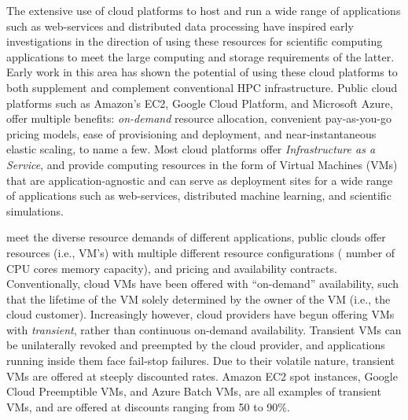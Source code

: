 \vikram
{
The extensive use of cloud platforms to host and run a wide range of applications such as web-services and distributed data processing have inspired early investigations in the direction of using these resources for scientific computing applications to meet the large computing and storage requirements of the latter. Early work in this area has shown the potential of using these cloud platforms to both supplement and complement conventional HPC infrastructure. Public cloud platforms such as Amazon's EC2, Google Cloud Platform, and Microsoft Azure, offer multiple benefits: \emph{on-demand} resource allocation, convenient pay-as-you-go pricing models, ease of provisioning and deployment, and near-instantaneous elastic scaling, to name a few. Most cloud platforms offer \emph{Infrastructure as a Service}, and provide computing resources in the form of Virtual Machines (VMs) that are application-agnostic and can serve as deployment sites for a wide range of applications such as web-services, distributed machine learning, and scientific simulations. 
}


 meet the diverse resource demands of different applications, public clouds offer resources (i.e., VM's) with multiple different resource configurations ( number of CPU cores memory capacity), and pricing and availability contracts. 
Conventionally, cloud VMs have been offered with ``on-demand'' availability, such that the lifetime of the VM  solely determined by the owner of the VM (i.e., the cloud customer). 
Increasingly however, cloud providers have begun offering VMs with \emph{transient}, rather than continuous on-demand availability. 
Transient VMs can be unilaterally revoked and preempted by the cloud provider, and applications running inside them face fail-stop failures. 
Due to their volatile nature, transient VMs are offered at steeply discounted rates. Amazon EC2 spot instances, Google Cloud Preemptible VMs, and Azure Batch VMs, are all examples of transient VMs, and are offered at discounts ranging from 50 to 90\%.  


